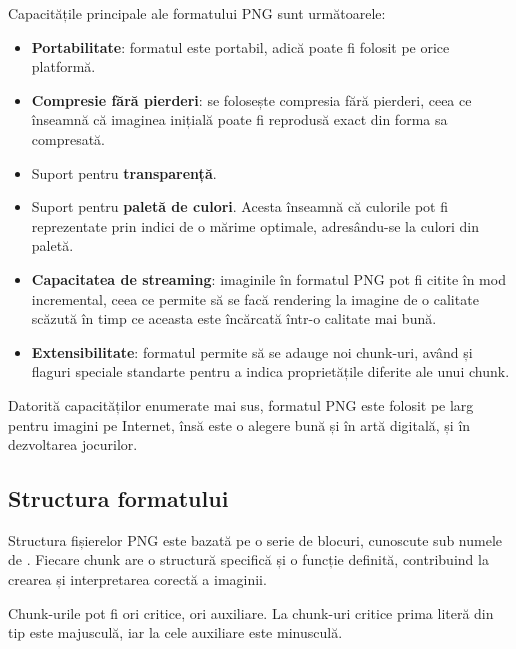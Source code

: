 \documentclass[a4paper,12pt]{report}
\begin{document}
Capacitățile principale ale formatului \ac{PNG} sunt următoarele:
\begin{itemize}
  \item 
  \textbf{Portabilitate}: formatul este portabil, adică poate fi folosit pe orice platformă.

  \item 
  \textbf{Compresie fără pierderi}: se folosește compresia fără pierderi,
  ceea ce înseamnă că imaginea inițială poate fi reprodusă exact din forma sa compresată.

  \item
  Suport pentru \textbf{transparență}.

  \item
  Suport pentru \textbf{paletă de culori}.
  Acesta înseamnă că culorile pot fi reprezentate prin indici de o mărime optimale,
  adresându-se la culori din paletă.
  
  \item
  \textbf{Capacitatea de streaming}: imaginile în formatul \ac{PNG} pot fi citite în mod incremental,
  ceea ce permite să se facă rendering la imagine de o calitate scăzută în timp ce 
  aceasta este încărcată într-o calitate mai bună.

  \item
  \textbf{Extensibilitate}: formatul permite să se adauge noi chunk-uri,
  având și flaguri speciale standarte pentru a indica proprietățile diferite ale unui chunk.
\end{itemize}

Datorită capacităților enumerate mai sus, formatul \ac{PNG} este folosit
pe larg pentru imagini pe Internet,
însă este o alegere bună și în artă digitală, și în dezvoltarea jocurilor.


\subsection{Structura formatului}

Structura fișierelor \ac{PNG} este bazată pe o serie de blocuri,
cunoscute sub numele de .
Fiecare chunk are o structură specifică și o funcție definită,
contribuind la crearea și interpretarea corectă a imaginii.

Chunk-urile pot fi ori critice, ori auxiliare.
La chunk-uri critice prima literă din tip este majusculă,
iar la cele auxiliare este minusculă.
\end{document}
